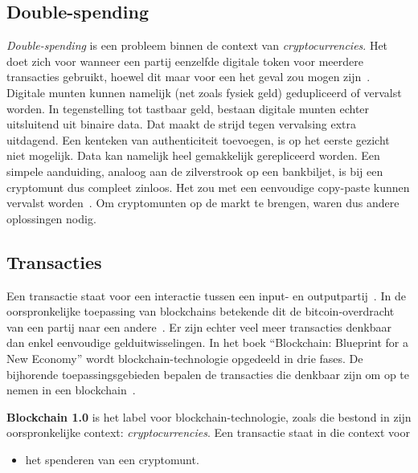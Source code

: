 \subsection{Double-spending}
\label{sub:double-spending}

\textit{Double-spending} is een probleem binnen de context van \textit{cryptocurrencies}. Het doet zich voor wanneer een partij eenzelfde digitale token voor meerdere transacties gebruikt, hoewel dit maar voor een het geval zou mogen zijn~\autocite{Chohan2021}. Digitale munten kunnen namelijk (net zoals fysiek geld) gedupliceerd of vervalst worden. In tegenstelling tot tastbaar geld, bestaan digitale munten echter uitsluitend uit binaire data. Dat maakt de strijd tegen vervalsing extra uitdagend. Een kenteken van authenticiteit toevoegen, is op het eerste gezicht niet mogelijk. Data kan namelijk heel gemakkelijk gerepliceerd worden. Een simpele aanduiding, analoog aan de zilverstrook op een bankbiljet, is bij een cryptomunt dus compleet zinloos. Het zou met een eenvoudige copy-paste kunnen vervalst worden~\autocite{Hoepman2008}. Om cryptomunten op de markt te brengen, waren dus andere oplossingen nodig.


\subsection{Transacties}
\label{sub:transacties}

Een transactie staat voor een interactie tussen een input- en outputpartij~\autocite{Salem2008}. In de oorspronkelijke toepassing van blockchains betekende dit de bitcoin-overdracht van een partij naar een andere~\autocite{Pierro2017}. Er zijn echter veel meer transacties denkbaar dan enkel eenvoudige gelduitwisselingen.
In het boek ``Blockchain: Blueprint for a New Economy'' wordt blockchain-technologie opgedeeld in drie fases. De bijhorende toepassingsgebieden bepalen de transacties die denkbaar zijn om op te nemen in een blockchain~\autocite{Swan2015}.

\textbf{Blockchain 1.0} is het label voor blockchain-technologie, zoals die bestond in zijn oorspronkelijke context: \textit{cryptocurrencies}. Een transactie staat in die context voor
\begin{itemize}
	\item het spenderen van een cryptomunt.
\end{itemize}


